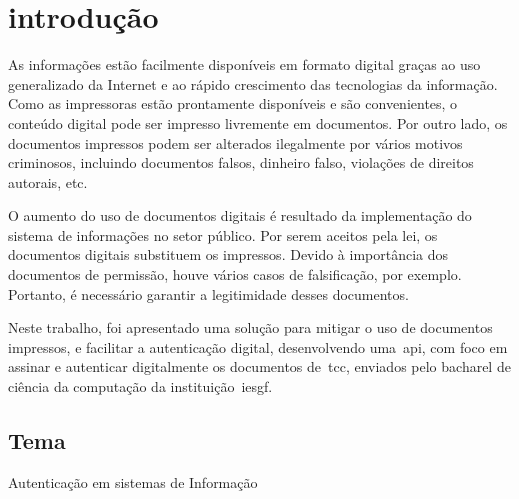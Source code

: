 \chapter{introdução}\label{ch:introducao}

As informações estão facilmente disponíveis em formato digital graças ao uso
generalizado da Internet e ao rápido crescimento das tecnologias da informação.
Como as impressoras estão prontamente disponíveis e são convenientes, o conteúdo
digital pode ser impresso livremente em documentos.
Por outro lado, os documentos impressos podem ser alterados ilegalmente por
vários motivos criminosos, incluindo documentos falsos, dinheiro falso,
violações de direitos autorais, etc\cite{tsai2019}.

O aumento do uso de documentos digitais é resultado da implementação do
sistema de informações no setor público.
Por serem aceitos pela lei, os documentos digitais substituem os impressos.
Devido à importância dos documentos de permissão, houve vários casos de
falsificação, por exemplo.
Portanto, é necessário garantir a legitimidade desses documentos\cite{
    arief2019}.

Neste trabalho, foi apresentado uma solução para mitigar o uso de documentos
impressos, e facilitar a autenticação digital, desenvolvendo uma~\acrfull{api},
com foco em assinar e autenticar digitalmente os documentos de~\acrfull{tcc},
enviados pelo bacharel de ciência da computação da instituição~\acrlong{iesgf}.
\section{Tema}\label{sec:tema}
Autenticação em sistemas de Informação




